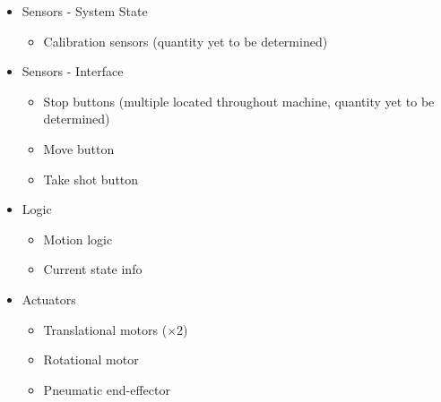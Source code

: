 \documentclass[titlepage]{article}
\begin{document}
\begin{itemize}
	\item Sensors - System State
	\begin{itemize}
		\item Calibration sensors (quantity yet to be determined)
	\end{itemize}
	\item Sensors - Interface
	\begin{itemize}
		\item Stop buttons (multiple located throughout machine, quantity yet to be determined)
		\item Move button
		\item Take shot button
	\end{itemize}
	\item Logic
	\begin{itemize}
		\item Motion logic
		\item Current state info
	\end{itemize}
	\item Actuators
	\begin{itemize}
		\item Translational motors ($\times2$)
		\item Rotational motor
		\item Pneumatic end-effector
	\end{itemize}
\end{itemize}
\end{document}
